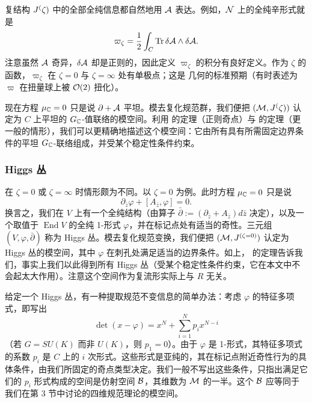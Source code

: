 复结构 $J^(\zeta)$ 中的全部全纯信息都自然地用 $\mathcal{A}$ 表达。例如，$\mathcal{N}$ 上的全纯辛形式就是
\begin{equation} \label{eq:symplectic-hk}
\varpi_\zeta = \frac{1}{2} \int_{C} {\operatorname{Tr}}\,\delta \mathcal{A} \wedge \delta \mathcal{A}.
\end{equation}
注意虽然 $\mathcal{A}$ 奇异，$\delta \mathcal{A}$ 却是正则的，因此定义 $\varpi_\zeta$ 的积分有良好定义。作为 $\zeta$ 的函数，$\varpi_\zeta$ 在 $\zeta=0$ 与 $\zeta = \infty$ 处有单极点；这是 \hk 几何的标准预期（有时表述为 $\varpi$ 在扭量球上被 $\mathcal{O}(2)$ 扭化）。

现在方程 $\mu_{\mathbb{C}} = 0$ 只是说 $\partial + \mathcal{A}$ 平坦。模去复化规范群，我们便把 $(\mathcal{M}, J^(\zeta))$ 认定为 $C$ 上平坦的 $G_{\mathbb{C}}$-值联络的模空间。利用 \cite{hbnc} 的定理（正则奇点）与 \cite{wnh} 的定理（更一般的情形），我们可以更精确地描述这个模空间：它由所有具有所需固定边界条件的平坦 $G_{\mathbb{C}}$-联络组成，并受某个稳定性条件约束。

\subsubsection{Higgs 丛}\label{sec:higgs}

在 $\zeta = 0$ 或 $\zeta = \infty$ 时情形颇为不同。以 $\zeta = 0$ 为例。此时方程 $\mu_{\mathbb{C}} = 0$ 只是说
\begin{equation}
\partial_{\bar z} \varphi + [A_{\bar z}, \varphi] = 0.
\end{equation}
换言之，我们在 $V$ 上有一个全纯结构（由算子 $\bar\partial := (\partial_{\bar z} + A_{\bar z}) d\bar{z}$ 决定），以及一个取值于 $\operatorname{End} V$ 的全纯 1-形式 $\varphi$，并在标记点处有适当的奇性。三元组 $(V, \varphi, \bar\partial)$ 称为 Higgs 丛。模去复化规范变换，我们便把 $(\mathcal{M}, J^{(\zeta = 0)})$ 认定为 Higgs 丛的模空间，其中 $\varphi$ 在刺孔处满足适当的边界条件。如上，\cite{hbnc,wnh} 的定理告诉我们，事实上我们以此得到所有 Higgs 丛（受某个稳定性条件约束，它在本文中不会起太大作用）。注意这个空间作为复流形实际上与 $R$ 无关。

给定一个 Higgs 丛，有一种提取规范不变信息的简单办法：考虑 $\varphi$ 的特征多项式，即写出
\begin{equation}
\det (x - \varphi) = x^N + \sum_{i=1}^N p_{i} x^{N-i}
\end{equation}
（若 $G = SU(K)$ 而非 $U(K)$，则 $p_1 = 0$）。由于 $\varphi$ 是 1-形式，其特征多项式的系数 $p_i$ 是 $C$ 上的 $i$ 次形式。这些形式是亚纯的，其在标记点附近奇性行为的具体条件，由我们所固定的奇点类型决定。我们一般不写出这些条件，只指出满足它们的 $p_i$ 形式构成的空间是仿射空间 $\mathcal{B}$，其维数为 $\mathcal{M}$ 的一半。这个 $\mathcal{B}$ 应等同于我们在第 3 节中讨论的四维规范理论的模空间。%

